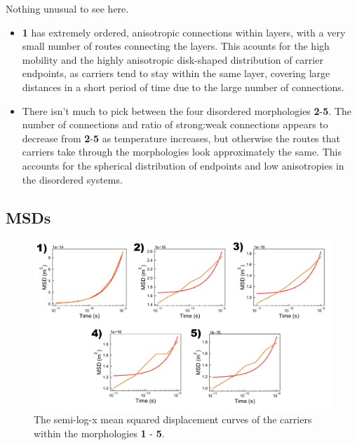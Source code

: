 \documentclass[12pt]{article}
\begin{document}
Nothing unusual to see here.

\begin{itemize}
    \item{\textbf{1} has extremely ordered, anisotropic connections within layers, with a very small number of routes connecting the layers. 
        This acounts for the high mobility and the highly anisotropic disk-shaped distribution of carrier endpoints, as carriers tend to stay within the same layer, covering large distances in a short period of time due to the large number of connections.}
    \item{There isn't much to pick between the four disordered morphologies \textbf{2}-\textbf{5}.
        The number of connections and ratio of strong:weak connections appears to decrease from \textbf{2}-\textbf{5} as temperature increases, but otherwise the routes that carriers take through the morphologies look approximately the same.
    This accounts for the spherical distribution of endpoints and low anisotropies in the disordered systems.}
\end{itemize}


\subsection{MSDs}


\begin{figure}[h!]\centering
	\includegraphics[width=\textwidth]{Figures/MSDHole.pdf}
    \caption{The semi-log-x mean squared displacement curves of the carriers within the morphologies \textbf{1} - \textbf{5}.}
	\label{fig:MSD}
\end{figure}
\end{document}
